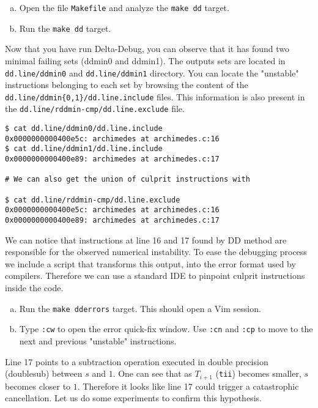 \begin{question}
  \begin{enumerate}[(a)]
    \item Open the file \texttt{Makefile} and analyze the \texttt{make dd} target.
    \item Run the \texttt{make dd} target.
  \end{enumerate}
\end{question}

Now that you have run Delta-Debug, you can observe that it has found two minimal failing sets (ddmin0 and ddmin1). The outputs sets are located in \texttt{dd.line/ddmin0} and \texttt{dd.line/ddmin1} directory. You can locate the "unstable" instructions belonging to each set by browsing the content of the \texttt{dd.line/ddmin\{0,1\}/dd.line.include} files. This information is also present in the \texttt{dd.line/rddmin-cmp/dd.line.exclude} file.

\begin{verbatim}
$ cat dd.line/ddmin0/dd.line.include
0x0000000000400e5c: archimedes at archimedes.c:16
$ cat dd.line/ddmin1/dd.line.include
0x0000000000400e89: archimedes at archimedes.c:17

# We can also get the union of culprit instructions with

$ cat dd.line/rddmin-cmp/dd.line.exclude
0x0000000000400e5c: archimedes at archimedes.c:16
0x0000000000400e89: archimedes at archimedes.c:17
\end{verbatim}

We can notice that instructions at line 16 and 17 found by DD method are responsible for the observed numerical instability. To ease the debugging process we include a script that transforms this output, into the error format used by compilers. Therefore we can use a standard IDE to pinpoint culprit instructions inside the code.

\begin{question}
  \begin{enumerate}[(a)]
    \item Run the \texttt{make dderrors} target. This should open a Vim session.
    \item Type \texttt{:cw} to open the error quick-fix window. Use \texttt{:cn} and \texttt{:cp} to move to the next and previous "unstable" instructions.
  \end{enumerate}
\end{question}

Line 17 points to a subtraction operation executed in double precision (doublesub) between $s$ and $1$. One can see that as $T_{i+1}$ (\texttt{tii}) becomes smaller, $s$ becomes closer to $1$. Therefore it looks like line 17 could trigger a catastrophic cancellation.
Let us do some experiments to confirm this hypothesis.

